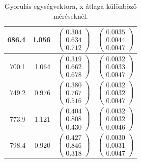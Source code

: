 \documentclass[10pt,pdftex]{report}
\begin{document}
\begin{table}[H]
\begin{tabular}{|r|r|r|r|}
        \hline
        686.4 & 1.056 & $\begin{pmatrix} 0.304 \\ 0.634 \\ 0.712\end{pmatrix}$ & $\begin{pmatrix} 0.0035 \\ 0.0044 \\ 0.0047\end{pmatrix}$ \\
        \hline
        700.1 & 1.064 & $\begin{pmatrix} 0.319 \\ 0.662 \\ 0.678\end{pmatrix}$ & $\begin{pmatrix} 0.0032 \\ 0.0033 \\ 0.0047\end{pmatrix}$ \\
        \hline
        749.2 & 0.976 & $\begin{pmatrix} 0.380 \\ 0.767 \\ 0.516\end{pmatrix}$ & $\begin{pmatrix} 0.0032 \\ 0.0032 \\ 0.0047\end{pmatrix}$ \\
        \hline
        773.9 & 1.121 & $\begin{pmatrix} 0.404 \\ 0.808 \\ 0.430\end{pmatrix}$ & $\begin{pmatrix} 0.0032 \\ 0.0032 \\ 0.0046\end{pmatrix}$ \\
        \hline
        798.4 & 0.920 & $\begin{pmatrix} 0.427 \\ 0.846 \\ 0.318\end{pmatrix}$ & $\begin{pmatrix} 0.0030 \\ 0.0031 \\ 0.0047\end{pmatrix}$ \\
        \hline
    \end{tabular}
    \caption{Gyorulás egységvektora, x átlaga különböző méréseknél.}
\end{table}
\end{document}
